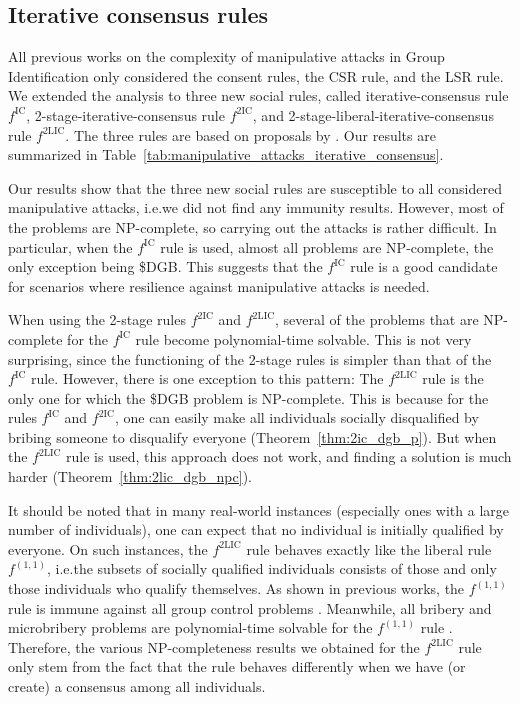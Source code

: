 \documentclass[
    12pt,               %
    a4paper,            %
    bibtotoc,           %
    pointlessnumbers,   %
    ngerman,            %
    titlepage,          %
    leqno,              %
    ]{scrarticle}       %
\newcommand\tableref{Table~\ref}
\newcommand\thmref{Theorem~\ref}
\begin{document}
\subsection{Iterative consensus rules}
\label{sec:conclusion_iterative_consensus}

All previous works on the complexity of manipulative attacks in Group Identification only considered the consent rules, the CSR rule, and the LSR rule. We extended the analysis to three new social rules, called iterative-consensus rule $f^{\text{IC}}$, 2-stage-iterative-consensus rule $f^{\text{2IC}}$, and 2-stage-liberal-iterative-consensus rule $f^{\text{2LIC}}$. The three rules are based on proposals by \textcite{KR97}. Our results are summarized in \tableref{tab:manipulative_attacks_iterative_consensus}.

Our results show that the three new social rules are susceptible to all considered manipulative attacks, i.e.\@ we did not find any immunity results. However, most of the problems are NP-complete, so carrying out the attacks is rather difficult. In particular, when the $f^{\text{IC}}$ rule is used, almost all problems are NP-complete, the only exception being \$DGB. This suggests that the $f^{\text{IC}}$ rule is a good candidate for scenarios where resilience against manipulative attacks is needed.

When using the 2-stage rules $f^{\text{2IC}}$ and $f^{\text{2LIC}}$, several of the problems that are NP-complete for the $f^{\text{IC}}$ rule become polynomial-time solvable. This is not very surprising, since the functioning of the 2-stage rules is simpler than that of the $f^{\text{IC}}$ rule. However, there is one exception to this pattern: The $f^{\text{2LIC}}$ rule is the only one for which the \$DGB problem is NP-complete. This is because for the rules $f^{\text{IC}}$ and $f^{\text{2IC}}$, one can easily make all individuals socially disqualified by bribing someone to disqualify everyone (\thmref{thm:2ic_dgb_p}). But when the $f^{\text{2LIC}}$ rule is used, this approach does not work, and finding a solution is much harder (\thmref{thm:2lic_dgb_npc}).

It should be noted that in many real-world instances (especially ones with a large number of individuals), one can expect that no individual is initially qualified by everyone. On such instances, the $f^{\text{2LIC}}$ rule behaves exactly like the liberal rule $f^{(1, 1)}$, i.e.\@ the subsets of socially qualified individuals consists of those and only those individuals who qualify themselves. As shown in previous works, the $f^{(1, 1)}$ rule is immune against all group control problems \cite{YD18,ERY20,J22}. Meanwhile, all bribery and microbribery problems are polynomial-time solvable for the $f^{(1, 1)}$ rule \cite{BBKL20}. Therefore, the various NP-completeness results we obtained for the $f^{\text{2LIC}}$ rule only stem from the fact that the rule behaves differently when we have (or create) a consensus among all individuals.
\end{document}

